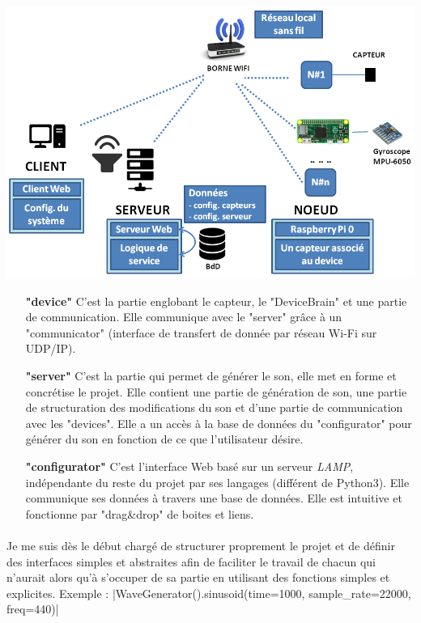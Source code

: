 \documentclass[12pt]{article}
\begin{document}
	\vspace{1cm}
	\noindent
	\includegraphics[width=\textwidth]{overall_sheme}
	\vspace{1cm}
	\begin{itemize}
		\item[\textbf{"device"}] C'est la partie englobant le capteur, le "DeviceBrain" et une partie de communication. Elle communique avec le "server" grâce à un "communicator" (interface de transfert de donnée par réseau Wi-Fi sur UDP/IP).\\
		\item[\textbf{"server"}] C'est la partie qui permet de générer le son, elle met en forme et concrétise le projet. Elle contient une partie de génération de son, une partie de structuration des modifications du son et d'une partie de communication avec les "devices". Elle a un accès à la base de données du "configurator" pour générer du son en fonction de ce que l'utilisateur désire.\\
		\item[\textbf{"configurator"}] C'est l'interface Web basé sur un serveur \textit{LAMP}, indépendante du reste du projet par ses langages (différent de Python3). Elle communique ses données à travers une base de données. Elle est intuitive et fonctionne par "drag\&drop" de boites et liens.
	\end{itemize}
	
	\paragraph{}
	Je me suis dès le début chargé de structurer proprement le projet et de définir des interfaces simples et abstraites afin de faciliter le travail de chacun qui n'aurait alors qu'à s'occuper de sa partie en utilisant des fonctions simples et explicites. Exemple :
	|WaveGenerator().sinusoid(time=1000, sample_rate=22000, freq=440)|
	
\end{document}

